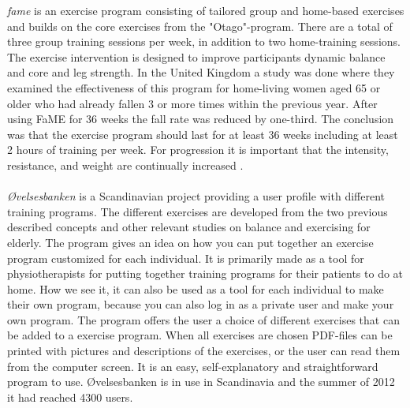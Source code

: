 \emph{\ac{fame}} is an exercise program consisting of tailored group and home-based exercises and builds on the core exercises from the "Otago"-program.  There are a total of three group training sessions per week, in addition to two home-training sessions. The exercise intervention is designed to improve participants dynamic balance and core and leg strength.  In the United Kingdom a study was done where they examined the effectiveness of this program for home-living women aged 65 or older who had already fallen 3 or more times within the previous year. After using FaME for 36 weeks the fall rate was reduced by one-third. The conclusion was that the exercise program should last for at least 36 weeks including at least 2 hours of training per week. For progression it is important that the intensity, resistance, and weight are continually increased \cite{fame}.\\ \\
\emph{{Ø}velsesbanken} is a Scandinavian project providing a user profile with different training programs. The different exercises are developed from the two previous described concepts and other relevant studies on balance and exercising for elderly. The program gives an idea on how you can put together an exercise program customized for each individual. It is primarily made as a tool for physiotherapists for putting together training programs for their patients to do at home. How we see it, it can also be used as a tool for each individual to make their own program, because you can also log in as a private user and make your own program. The program offers the user a choice of different exercises that can be added to a exercise program. When all exercises are chosen PDF-files can be printed with pictures and descriptions of the exercises, or the user can read them from the computer screen. It is an easy, self-explanatory and straightforward program to use. {Ø}velsesbanken is in use in Scandinavia and the summer of 2012 it had reached 4300 users. \cite{ovelsesbank}\\ \\

